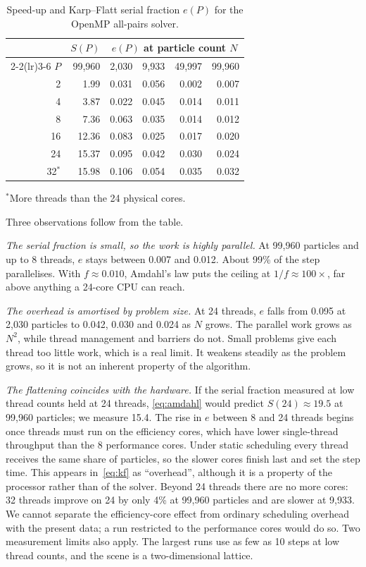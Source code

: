 \documentclass[conference]{IEEEtran}
\begin{document}
\begin{table}[!htb]
\centering
\caption{Speed-up and Karp--Flatt serial fraction $e(P)$ for the OpenMP all-pairs solver.}
\label{tab:kf}
\footnotesize
\setlength{\tabcolsep}{4.5pt}
\begin{tabular}{rrrrrr}
\toprule
 & $S(P)$ & \multicolumn{4}{c}{$e(P)$ at particle count $N$} \\
\cmidrule(lr){2-2}\cmidrule(lr){3-6}
$P$ & 99,960 & 2,030 & 9,933 & 49,997 & 99,960 \\
\midrule
2  & 1.99  & 0.031 & 0.056 & 0.002 & 0.007 \\
4  & 3.87  & 0.022 & 0.045 & 0.014 & 0.011 \\
8  & 7.36  & 0.063 & 0.035 & 0.014 & 0.012 \\
16 & 12.36 & 0.083 & 0.025 & 0.017 & 0.020 \\
24 & 15.37 & 0.095 & 0.042 & 0.030 & 0.024 \\
32$^{*}$ & 15.98 & 0.106 & 0.054 & 0.035 & 0.032 \\
\bottomrule
\end{tabular}

\vspace{2pt}
{\scriptsize $^{*}$More threads than the 24 physical cores.}
\end{table}

Three observations follow from the table.

\emph{The serial fraction is small, so the work is highly parallel.} At 99,960 particles and up to 8 threads, $e$ stays between 0.007 and 0.012. About 99\% of the step parallelises. With $f\approx0.010$, Amdahl's law puts the ceiling at $1/f\approx100\times$, far above anything a 24-core CPU can reach.

\emph{The overhead is amortised by problem size.} At 24 threads, $e$ falls from 0.095 at 2,030 particles to 0.042, 0.030 and 0.024 as $N$ grows. The parallel work grows as $N^2$, while thread management and barriers do not. Small problems give each thread too little work, which is a real limit. It weakens steadily as the problem grows, so it is not an inherent property of the algorithm.

\emph{The flattening coincides with the hardware.} If the serial fraction measured at low thread counts held at 24 threads, \eqref{eq:amdahl} would predict $S(24)\approx19.5$ at 99,960 particles; we measure 15.4. The rise in $e$ between 8 and 24 threads begins once threads must run on the efficiency cores, which have lower single-thread throughput than the 8 performance cores. Under static scheduling every thread receives the same share of particles, so the slower cores finish last and set the step time. This appears in~\eqref{eq:kf} as ``overhead'', although it is a property of the processor rather than of the solver. Beyond 24 threads there are no more cores: 32 threads improve on 24 by only 4\% at 99,960 particles and are slower at 9,933. We cannot separate the efficiency-core effect from ordinary scheduling overhead with the present data; a run restricted to the performance cores would do so. Two measurement limits also apply. The largest runs use as few as 10 steps at low thread counts, and the scene is a two-dimensional lattice.
\end{document}
